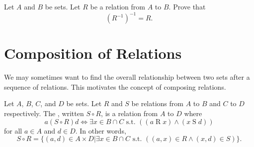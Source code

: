 \begin{exercise}
    Let $A$ and $B$ be sets. Let $R$ be a relation from $A$ to $B$. Prove that
    \[
        \left(R^{-1}\right)^{-1} = R.
    \]
\end{exercise}

\section{Composition of Relations}
We may sometimes want to find the overall relationship between two sets after a sequence of relations. This motivates the concept of composing relations.

\begin{definition}
    Let $A$, $B$, $C$, and $D$ be sets. Let $R$ and $S$ be relations from $A$ to $B$ and $C$ to $D$ respectively. The , written $S \circ R$, is a relation from $A$ to $D$ where
    \[
        a (\mathrel{S \circ R}) d \iff \exists x \in B \cap C \text{ s.t. } ((a \mathrel{R} x) \land (x \mathrel{S} d))
    \]
    for all $a \in A$ and $d \in D$. In other words,
    \[
        S \circ R = \{(a, d) \in A \times D \vert \exists x \in B \cap C \text{ s.t. } ((a, x) \in R \land (x, d) \in S)\}.
    \]
\end{definition}

